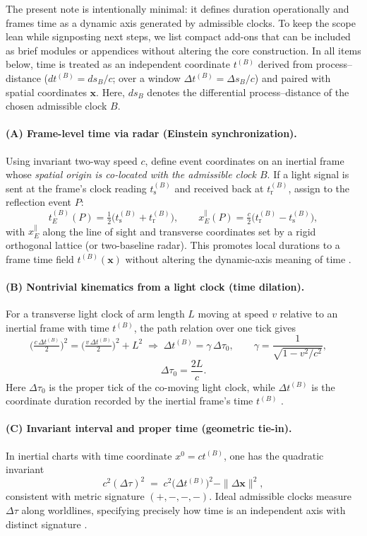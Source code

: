 \documentclass[12pt]{article}
\begin{document}
The present note is intentionally minimal: it defines duration operationally and frames
time as a dynamic axis generated by admissible clocks. To keep the scope lean while
signposting next steps, we list compact add-ons that can be included as brief modules
or appendices without altering the core construction. In all items below, time is treated
as an independent coordinate \(t^{(B)}\) derived from process–distance
(\(dt^{(B)}=ds_B/c\); over a window \(\Delta t^{(B)}=\Delta s_B/c\)) and paired with
spatial coordinates \(\mathbf{x}\). Here, \(ds_B\) denotes the differential
process–distance of the chosen admissible clock \(B\).

\paragraph{(A) Frame-level time via radar (Einstein synchronization).}
Using invariant two-way speed \(c\), define event coordinates on an inertial frame whose
\emph{spatial origin is co-located with the admissible clock \(B\)}. If a light signal is
sent at the frame’s clock reading \(t^{(B)}_{\mathrm{s}}\) and received back at
\(t^{(B)}_{\mathrm{r}}\), assign to the reflection event \(P\):
\[
t^{(B)}_E(P)=\tfrac{1}{2}\big(t^{(B)}_{\mathrm{s}}+t^{(B)}_{\mathrm{r}}\big),\qquad
x_E^{\parallel}(P)=\tfrac{c}{2}\big(t^{(B)}_{\mathrm{r}}-t^{(B)}_{\mathrm{s}}\big),
\]
with \(x_E^{\parallel}\) along the line of sight and transverse coordinates set by a rigid
orthogonal lattice (or two-baseline radar). This promotes local durations to a frame time
field \(t^{(B)}(\mathbf{x})\) without altering the dynamic-axis meaning of time \cite{Einstein1905}.

\paragraph{(B) Nontrivial kinematics from a light clock (time dilation).}
For a transverse light clock of arm length \(L\) moving at speed \(v\) relative to an
inertial frame with time \(t^{(B)}\), the path relation over one tick gives
\[
\Big(\tfrac{c\,\Delta t^{(B)}}{2}\Big)^2=\Big(\tfrac{v\,\Delta t^{(B)}}{2}\Big)^2+L^2
\;\Rightarrow\;
\Delta t^{(B)}=\gamma\,\Delta\tau_0,\qquad
\gamma=\frac{1}{\sqrt{1-v^2/c^2}},\quad
\]
\[
\Delta\tau_0=\frac{2L}{c}.
\]
Here \(\Delta\tau_0\) is the proper tick of the co-moving light clock, while
\(\Delta t^{(B)}\) is the coordinate duration recorded by the inertial frame’s time \(t^{(B)}\) \cite{Rindler2006}.

\paragraph{(C) Invariant interval and proper time (geometric tie-in).}
In inertial charts with time coordinate \(x^0=ct^{(B)}\), one has the quadratic invariant
\[
c^2(\Delta\tau)^2 \;=\; c^2\big(\Delta t^{(B)}\big)^2 - \|\Delta\mathbf{x}\|^2,
\]
consistent with metric signature \((+,-,-,-)\). Ideal admissible clocks measure \(\Delta\tau\)
along worldlines, specifying precisely how time is an independent axis with distinct signature
\cite{Rindler2006}.
\end{document}
